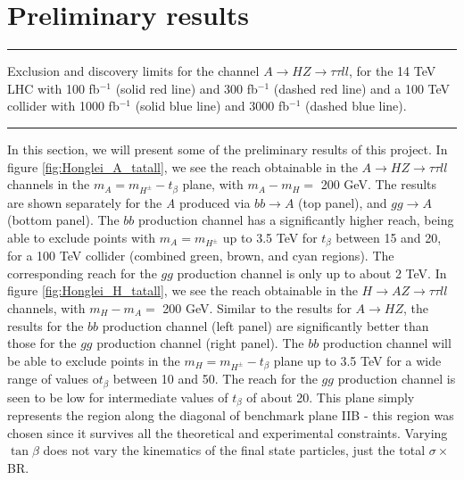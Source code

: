 {\section{Preliminary results}\label{sec:exo_higgs_results}
\begin{marginfigure}[-2.2in]
\centering
\hrule\vspace{\onelineskip}
  \caption{Exclusion and discovery limits for the channel $A\rightarrow HZ\rightarrow \tau\tau ll$, for the 14 TeV LHC with 100 fb$^{-1}$ (solid red line) and 300 fb$^{-1}$ (dashed red line) and a 100 TeV collider with 1000 fb$^{-1}$ (solid blue line) and 3000 fb$^{-1}$ (dashed blue line).}
  \vspace{\onelineskip}\hrule
\label{fig:Honglei_A_tatall}
\end{marginfigure}
In this section, we will present some of the preliminary results of this project. In figure \ref{fig:Honglei_A_tatall}, we see the reach obtainable in the $A\rightarrow HZ\rightarrow \tau\tau ll$ channels in the $m_A = m_{H^\pm} - t_\beta$ plane, with $m_A - m_H = $ 200 GeV. The results are shown separately for the \emph{A} produced via $bb\rightarrow A$ (top panel), and $gg\rightarrow A$ (bottom panel). The $bb$ production channel has a significantly higher reach, being able to exclude points with $m_A = m_{H^\pm}$ up to 3.5 TeV for $t_\beta$ between 15 and 20, for a 100 TeV collider (combined green, brown, and cyan regions). The corresponding reach for the $gg$ production channel is only up to about 2 TeV. In figure \ref{fig:Honglei_H_tatall}, we see the reach obtainable in the $H\rightarrow AZ\rightarrow \tau\tau ll$ channels, with $m_H - m_A =$ 200 GeV. Similar to the results for $A\rightarrow HZ$, the results for the $bb$ production channel (left panel) are significantly better than those for the $gg$ production channel (right panel). The $bb$ production channel will be able to exclude points in the $m_H = m_{H^\pm} - t_\beta$ plane up to 3.5 TeV for a wide range of values o$t_\beta$ between 10 and 50. The reach for the $gg$ production channel is seen to be low for intermediate values of $t_\beta$ of about 20. This plane simply represents the region along the diagonal of benchmark plane IIB - this region was chosen since it survives all the theoretical and experimental constraints. Varying $\tan\beta$ does not vary the kinematics of the final state particles, just the total $\sigma\times$BR. 
}
